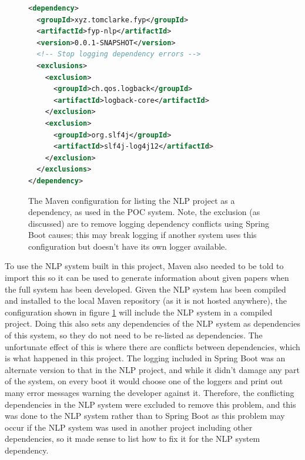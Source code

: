 \begin{figure}
	\begin{lstlisting}[language=XML]
<dependency>
  <groupId>xyz.tomclarke.fyp</groupId>
  <artifactId>fyp-nlp</artifactId>
  <version>0.0.1-SNAPSHOT</version>
  <!-- Stop logging dependency errors -->
  <exclusions>
    <exclusion>
      <groupId>ch.qos.logback</groupId>
      <artifactId>logback-core</artifactId>
    </exclusion>
    <exclusion>
      <groupId>org.slf4j</groupId>
      <artifactId>slf4j-log4j12</artifactId>
    </exclusion>
  </exclusions>
</dependency>
	\end{lstlisting}
	\caption[Configuration to set the NLP system as a dependency in Maven]{The Maven configuration for listing the NLP project as a dependency, as used in the POC system. Note, the exclusion (as discussed) are to remove logging dependency conflicts using Spring Boot causes; this may break logging if another system uses this configuration but doesn't have its own logger available.}
	\label{figure:nlpdependency}
\end{figure}

To use the NLP system built in this project, Maven also needed to be told to import this so it can be used to generate information about given papers when the full system has been developed. Given the NLP system has been compiled and installed to the local Maven repository (as it is not hosted anywhere), the configuration shown in figure \ref{figure:nlpdependency} will include the NLP system in a compiled project. Doing this also sets any dependencies of the NLP system as dependencies of this system, so they do not need to be re-listed as dependencies. The unfortunate effect of this is where there are conflicts between dependencies, which is what happened in this project. The logging included in Spring Boot was an alternate version to that in the NLP project, and while it didn't damage any part of the system, on every boot it would choose one of the loggers and print out many error messages warning the developer against it. Therefore, the conflicting dependencies in the NLP system were excluded to remove this problem, and this was done to the NLP system rather than to Spring Boot as this problem may occur if the NLP system was used in another project including other dependencies, so it made sense to list how to fix it for the NLP system dependency. 

